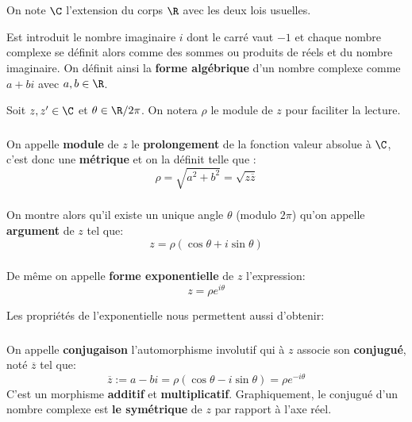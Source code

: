 \chapter*{} %

On note \(\C\) l'extension du corps \(\R\) avec les deux lois usuelles. \< 

Est introduit le nombre imaginaire \(i\) dont le carré vaut \(-1\) et chaque nombre complexe se définit alors comme des sommes ou produits de réels et du nombre imaginaire.\+
On définit ainsi la \textbf{forme algébrique} d'un nombre complexe comme \(a + bi\) avec \(a, b \in \R\). \<

Soit \(z, z' \in \C\) et \(\theta \in \R/2\pi\). On notera \(\rho\) le module de \(z\) pour faciliter la lecture.

\subsection*{}
On appelle \textbf{module} de \(z\) le \textbf{prolongement} de la fonction valeur absolue à \(\C\), c'est donc une \textbf{métrique} et on la définit telle que {:}
\[
    \rho = \sqrt{a^2 + b^2} = \sqrt{z\overline{z}} 
\]

\subsection*{}
On montre alors qu'il existe un unique angle \(\theta\) (modulo \(2\pi\)) qu'on appelle \textbf{argument} de \(z\) tel que:
\[
    z = \rho(\cos\theta+i\sin\theta)   
\]

\subsection*{}
De même on appelle \textbf{forme exponentielle} de \(z\) l'expression:
\[
    z = \rho e^{i\theta} 
\]

Les propriétés de l'exponentielle nous permettent aussi d'obtenir:

\subsection*{}
On appelle \textbf{conjugaison} l'automorphisme involutif qui à \(z\) associe son \textbf{conjugué}, noté \(\overline{z}\) tel que:
\[
    \overline{z} := a - bi = \rho(\cos\theta - i\sin\theta) = \rho e^{-i\theta}
\]
C'est un morphisme \textbf{additif} et \textbf{multiplicatif}. Graphiquement, le conjugué d'un nombre complexe est \textbf{le symétrique} de \(z\) par rapport à l'axe réel.\<

